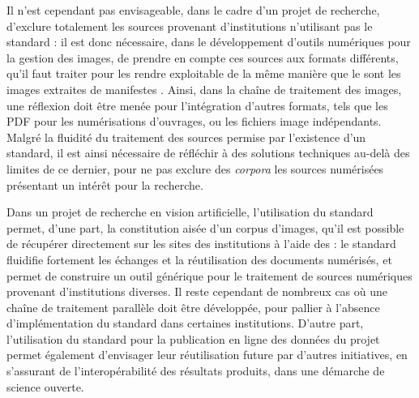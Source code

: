 Il n'est cependant pas envisageable, dans le cadre d'un projet de recherche, d'exclure totalement les sources provenant d'institutions n'utilisant pas le standard \iiif : il est donc nécessaire, dans le développement d'outils numériques pour la gestion des images, de prendre en compte ces sources aux formats différents, qu'il faut traiter pour les rendre exploitable de la même manière que le sont les images extraites de manifestes \iiif. Ainsi, dans la chaîne de traitement des images, une réflexion doit être menée pour l'intégration d'autres formats, tels que les PDF pour les numérisations d'ouvrages, ou les fichiers image indépendants. Malgré la fluidité du traitement des sources permise par l'existence d'un standard, il est ainsi nécessaire de réfléchir à des solutions techniques au-delà des limites de ce dernier, pour ne pas exclure des \textit{corpora} les sources numérisées présentant un intérêt pour la recherche. 

Dans un projet de recherche en vision artificielle, l'utilisation du standard \iiif permet, d'une part, la constitution aisée d'un corpus d'images, qu'il est possible de récupérer directement sur les sites des institutions à l'aide des \api : le standard \iiif fluidifie fortement les échanges et la réutilisation des documents numérisés, et permet de construire un outil générique pour le traitement de sources numériques provenant d'institutions diverses. Il reste cependant de nombreux cas où une chaîne de traitement parallèle doit être développée, pour pallier à l'absence d'implémentation du standard dans certaines institutions. D'autre part, l'utilisation du standard \iiif pour la publication en ligne des données du projet permet également d'envisager leur réutilisation future par d'autres initiatives, en s'assurant de l'interopérabilité des résultats produits, dans une démarche de science ouverte.

